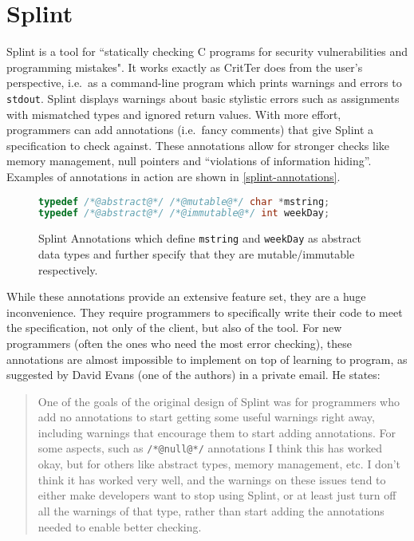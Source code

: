 \documentclass[12pt]{report}
\newcommand{\programName}{CritTer\xspace}
\begin{document}
\section{Splint}
\label{sec:splint}

Splint is a tool for ``statically checking C programs for security vulnerabilities and programming 
mistakes"\cite[p.\ 9]{splint-manual}. It works exactly as \programName does from the user's
perspective, i.e.\ as a command-line program which prints warnings and errors to \lstinline{stdout}. 
Splint displays warnings about basic stylistic errors such as assignments with mismatched types and 
ignored return values. With more effort, programmers can add annotations (i.e.\ fancy comments) that 
give Splint a specification to check against. These annotations allow for stronger checks like memory 
management, null pointers and ``violations of information hiding''\cite[p. 9]{splint-manual}. 
Examples of annotations in action are shown in \autoref{splint-annotations}.

\begin{figure}
\begin{lstlisting}[frame=single, language=C]
typedef /*@abstract@*/ /*@mutable@*/ char *mstring;
typedef /*@abstract@*/ /*@immutable@*/ int weekDay;
\end{lstlisting}
\caption[Splint Annotations]{Splint Annotations which define \lstinline{mstring} and \lstinline{weekDay} as abstract data types and further specify that they are mutable\slash immutable respectively.} 
\label{splint-annotations}
\end{figure}

While these annotations provide an extensive feature set, they are a huge inconvenience. They 
require programmers to specifically write their code to meet the specification, not only of the client, but 
also of the tool. For new programmers (often the ones who need the most error checking), these 
annotations are almost impossible to implement on top of learning to program, as suggested by  
David Evans (one of the authors) in a private email. He states:
\begin{quote} \singlespacing
One of the goals of the original design of 
Splint was for programmers who add no annotations to start getting some useful warnings right away, 
including warnings that encourage them to start adding annotations.  For some aspects, such as 
\lstinline{/*@null@*/} annotations I think this has worked okay, but for others like abstract types, 
memory management, etc. I don't think it has worked very well, and the warnings on these issues tend 
to either make developers want to stop using Splint, or at least just turn off all the warnings of that type, 
rather than start adding the annotations needed to enable better checking.\cite{evans-email} 
\end{quote}
\end{document}

